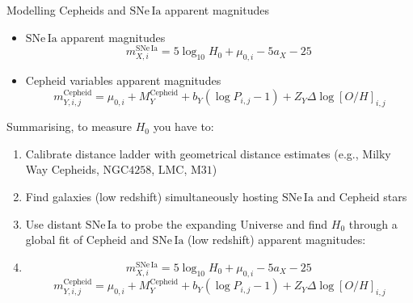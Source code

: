 \documentclass{beamer}
\newcommand{\LMC}{\mathrm{LMC}}
\newcommand{\MW}{\mathrm{MW}}
\newcommand{\Cepheid}{\mathrm{Cepheid}}
\newcommand{\SNe}{\mathrm{SNe\,Ia}}
\newcommand{\MAnd}{\mathrm{M31}}
\newcommand{\NGC}{\mathrm{NGC4258}}
\begin{document}
\begin{frame}{Modelling Cepheids and $\SNe$ apparent magnitudes}
\begin{itemize}
\item $\SNe$ apparent magnitudes
\begin{equation*}
m_{X,i}^{\SNe} =  5 \log_{10} H_0 + \mu_{0,i} - 5 a_X - 25 \, %
\end{equation*}
\item Cepheid variables apparent magnitudes 
\begin{equation*}\label{Eq:P-L-equation}
m_{Y,i,j}^{\Cepheid} = \mu_{0,i} + M_Y^{\Cepheid} + b_Y (\log P_{i,j}-1) + Z_Y \Delta \log[O/H]_{i,j}%
\end{equation*}
\end{itemize}
\end{frame}

\begin{frame}{Summarising, to measure $H_0$ you have to:}
\begin{enumerate}
\item Calibrate distance ladder with geometrical distance estimates (e.g., Milky Way Cepheids, $\NGC$, $\LMC$, $\MAnd$)
\item Find galaxies (low redshift) simultaneously hosting $\SNe$ and Cepheid stars
\item Use distant $\SNe$ to probe the expanding Universe and find $H_0$ through a global fit of Cepheid and $\SNe$ (low redshift) apparent magnitudes:
\item[]
\begin{equation*}
m_{X,i}^{\SNe} =  5 \log_{10} H_0 + \mu_{0,i} - 5 a_X - 25 \, %
\end{equation*}
\begin{equation*}\label{Eq:P-L-equation}
m_{Y,i,j}^{\Cepheid} = \mu_{0,i} + M_Y^{\Cepheid} + b_Y (\log P_{i,j}-1) + Z_Y \Delta \log[O/H]_{i,j}%
\end{equation*}
\end{enumerate}
\end{frame}
\end{document}
